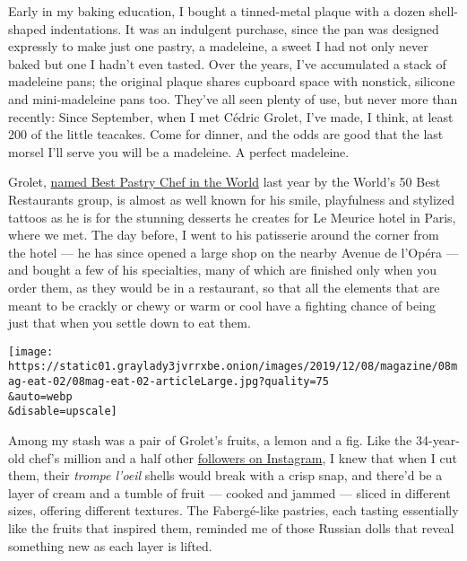 Early in my baking education, I bought a tinned-metal plaque with a
dozen shell-shaped indentations. It was an indulgent purchase, since the
pan was designed expressly to make just one pastry, a madeleine, a sweet
I had not only never baked but one I hadn't even tasted. Over the years,
I've accumulated a stack of madeleine pans; the original plaque shares
cupboard space with nonstick, silicone and mini-madeleine pans too.
They've all seen plenty of use, but never more than recently: Since
September, when I met Cédric Grolet, I've made, I think, at least 200 of
the little teacakes. Come for dinner, and the odds are good that the
last morsel I'll serve you will be a madeleine. A perfect madeleine.

Grolet,
\href{https://www.theworlds50best.com/stories/News/cedric-grolet-worlds-best-pastry-chef.html}{named
Best Pastry Chef in the World} last year by the World's 50 Best
Restaurants group, is almost as well known for his smile, playfulness
and stylized tattoos as he is for the stunning desserts he creates for
Le Meurice hotel in Paris, where we met. The day before, I went to his
patisserie around the corner from the hotel --- he has since opened a
large shop on the nearby Avenue de l'Opéra --- and bought a few of his
specialties, many of which are finished only when you order them, as
they would be in a restaurant, so that all the elements that are meant
to be crackly or chewy or warm or cool have a fighting chance of being
just that when you settle down to eat them.

\texttt{[image: https://static01.graylady3jvrrxbe.onion/images/2019/12/08/magazine/08mag-eat-02/08mag-eat-02-articleLarge.jpg?quality=75\\\&auto=webp\\\&disable=upscale]}

Among my stash was a pair of Grolet's fruits, a lemon and a fig. Like
the 34-year-old chef's million and a half other
\href{https://www.instagram.com/cedricgrolet/}{followers on Instagram},
I knew that when I cut them, their \emph{trompe l'oeil} shells would
break with a crisp snap, and there'd be a layer of cream and a tumble of
fruit --- cooked and jammed --- sliced in different sizes, offering
different textures. The Fabergé-like pastries, each tasting essentially
like the fruits that inspired them, reminded me of those Russian dolls
that reveal something new as each layer is lifted.

